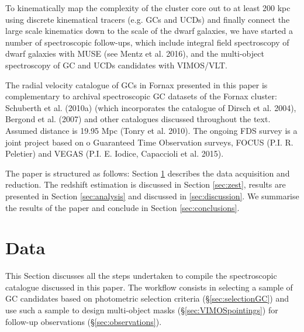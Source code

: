 \documentclass[useAMS,usenatbib]{mn2e}
\begin{document}
To kinematically map the complexity of the cluster core out to at least 200 kpc using discrete kinematical tracers (e.g. GCs and UCDs) and finally connect the large scale kinematics down to the scale of the dwarf galaxies, we have started a number of spectroscopic follow-ups, which include integral field spectroscopy of dwarf galaxies with MUSE (see Mentz et al. 2016), and the multi-object spectroscopy  of GC and UCDs candidates with VIMOS/VLT.

The radial velocity catalogue of GCs in Fornax presented in this paper is complementary to archival spectroscopic GC datasets of the Fornax cluster: Schuberth et al. (2010a) (which incorporates the catalogue of Dirsch et al.
2004), Bergond et al. (2007) and other catalogues discussed throughout the text. 
Assumed distance is 19.95 Mpc (Tonry et al. 2010).  The ongoing FDS survey is a joint project based on o Guaranteed Time Observation surveys, FOCUS (P.I. R. Peletier) and VEGAS (P.I. E. Iodice, Capaccioli et al. 2015).

The paper is structured as follows: Section \ref{sec:data} describes the data acquisition and reduction. The redshift estimation is discussed in Section \ref{sec:zest}, results are presented in Section \ref{sec:analysis} and discussed in \ref{sec:discussion}. We summarise the results of the paper and conclude in Section \ref{sec:conclusions}. 

\section{Data}
\label{sec:data}

This Section discusses all the steps undertaken to compile the spectroscopic catalogue discussed in this paper. The workflow consists in selecting a sample of GC candidates based on photometric selection criteria (\S \ref{sec:selectionGC}) and use such a sample to design multi-object masks (\S \ref{sec:VIMOSpointings}) for follow-up observations (\S \ref{sec:observations}).
\end{document}
